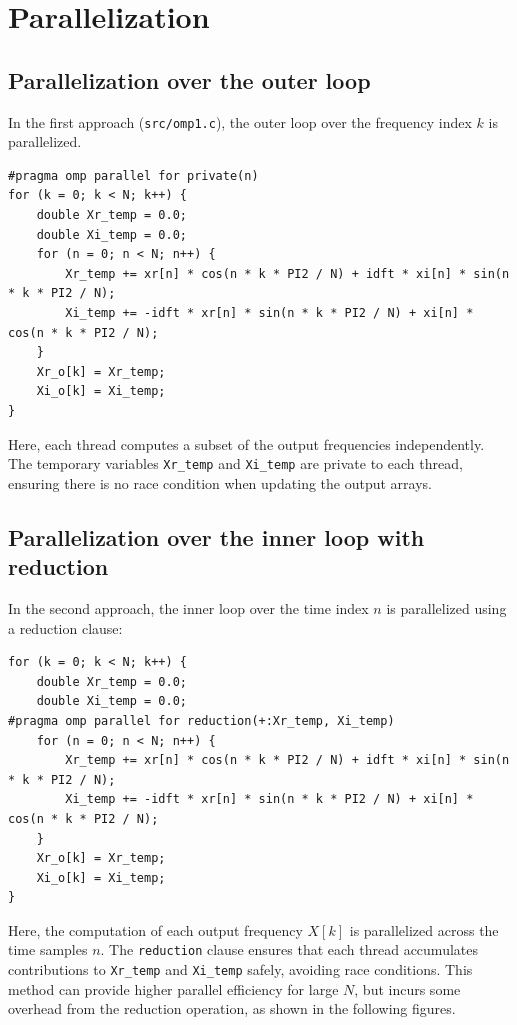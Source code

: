 \newpage
\section{Parallelization}
\label{sec:parallelization}

\subsection{Parallelization over the outer loop}
In the first approach (\texttt{src/omp1.c}), the outer loop over the frequency index $k$ is parallelized.

\begin{lstlisting}
#pragma omp parallel for private(n)
for (k = 0; k < N; k++) {
    double Xr_temp = 0.0;
    double Xi_temp = 0.0;
    for (n = 0; n < N; n++) {
        Xr_temp += xr[n] * cos(n * k * PI2 / N) + idft * xi[n] * sin(n * k * PI2 / N);
        Xi_temp += -idft * xr[n] * sin(n * k * PI2 / N) + xi[n] * cos(n * k * PI2 / N);
    }
    Xr_o[k] = Xr_temp;
    Xi_o[k] = Xi_temp;
}
\end{lstlisting}

\noindent
Here, each thread computes a subset of the output frequencies independently. The temporary variables \texttt{Xr\_temp} and \texttt{Xi\_temp} are private to each thread, ensuring there is no race condition when updating the output arrays.

\subsection{Parallelization over the inner loop with reduction}

In the second approach, the inner loop over the time index $n$ is parallelized using a reduction clause:

\begin{lstlisting}
for (k = 0; k < N; k++) {
    double Xr_temp = 0.0;
    double Xi_temp = 0.0;
#pragma omp parallel for reduction(+:Xr_temp, Xi_temp)
    for (n = 0; n < N; n++) {
        Xr_temp += xr[n] * cos(n * k * PI2 / N) + idft * xi[n] * sin(n * k * PI2 / N);
        Xi_temp += -idft * xr[n] * sin(n * k * PI2 / N) + xi[n] * cos(n * k * PI2 / N);
    }
    Xr_o[k] = Xr_temp;
    Xi_o[k] = Xi_temp;
}
\end{lstlisting}

\noindent
Here, the computation of each output frequency $X[k]$ is parallelized across the time samples $n$. The \texttt{reduction} clause ensures that each thread accumulates contributions to \texttt{Xr\_temp} and \texttt{Xi\_temp} safely, avoiding race conditions. This method can provide higher parallel efficiency for large $N$, but incurs some overhead from the reduction operation, as shown in the following figures.

